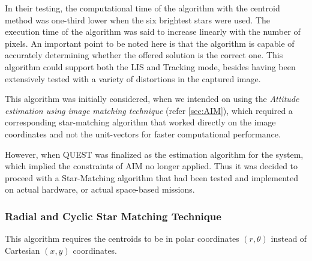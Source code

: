 \documentclass[../../main.tex]{subfiles}
\begin{document}
In their testing, the computational time of the algorithm with the centroid method was one-third lower when the six brightest stars were used. The execution time of the algorithm was said to increase linearly with the number of pixels.
An important point to be noted here is that the algorithm is capable of accurately determining whether the offered solution is the correct one.
This algorithm could support both the LIS and Tracking mode, besides having been extensively tested with a variety of distortions in the captured image.

This algorithm was initially considered, when we intended on using the \textit{Attitude estimation using image matching technique} (refer \ref{sec:AIM}), which required a corresponding star-matching  algorithm that worked directly on the image coordinates and not the unit-vectors for faster computational performance. 

However, when QUEST was finalized as the estimation algorithm for the system, which implied the constraints of AIM no longer applied. Thus it was decided to proceed with a Star-Matching algorithm that had been tested and implemented on actual hardware, or actual space-based missions.


\subsubsection{Radial and Cyclic Star Matching Technique}

This algorithm \cite{zhang2008full} requires the centroids to be in polar coordinates $(r, \theta)$ instead of Cartesian $(x, y)$ coordinates.
\end{document}
